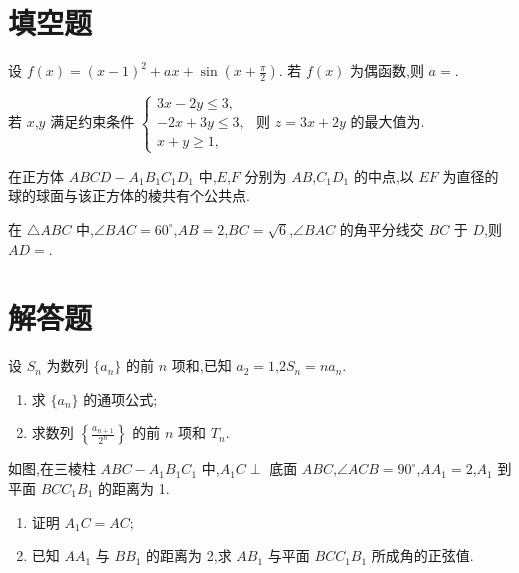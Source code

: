 \section{填空题}

\begin{problem}
设 \( f(x)=\left( x-1 \right)^2+ax+\sin\left( x+\frac{\pi}{2} \right) \). 若 \( f(x) \) 为偶函数,则 \( a= \)\fillinblank{}.
\end{problem}

\begin{problem}
若 \(x\),\(y\) 满足约束条件
\(\begin{cases}
3x-2y\le 3,\\
-2x+3y\le 3,\\
x+y\ge 1,
\end{cases}\)
则 \( z=3x+2y \) 的最大值为\fillinblank{}.
\end{problem}

\begin{problem}
在正方体 \( ABCD-A_1B_1C_1D_1 \) 中,\(E\),\(F\) 分别为 \(AB\),\(C_1D_1\) 的中点,以 \(EF\) 为直径的球的球面与该正方体的棱共有\fillinblank{}个公共点.
\end{problem}

\begin{problem}
在 \( \triangle ABC \) 中,\( \angle BAC=60^\circ \),\( AB=2 \),\( BC=\sqrt{6} \),\( \angle BAC \) 的角平分线交 \(BC\) 于 \(D\),则 \( AD= \)\fillinblank{}.
\end{problem}

\section{解答题}

\begin{problem}
设 \( S_n \) 为数列 \( \{a_n\} \) 的前 \( n \) 项和,已知 \( a_2=1 \),\( 2S_n=na_n \).

\begin{enumerate}
\item 求 \( \{a_n\} \) 的通项公式;
\item 求数列 \( \left\{ \frac{a_{n+1}}{2^n} \right\} \) 的前 \( n \) 项和 \( T_n \).
\end{enumerate}
\end{problem}

\begin{problem}
如图,在三棱柱 \( ABC-A_1B_1C_1 \) 中,\( A_1C\perp \) 底面 \(ABC\),\( \angle ACB=90^\circ \),\( AA_1=2 \),\(A_1\) 到平面 \(BCC_1B_1\) 的距离为 1.

\begin{enumerate}
\item 证明 \( A_1C=AC \);
\item 已知 \(AA_1\) 与 \(BB_1\) 的距离为 2,求 \(AB_1\) 与平面 \(BCC_1B_1\) 所成角的正弦值.
\end{enumerate}

\end{problem}

